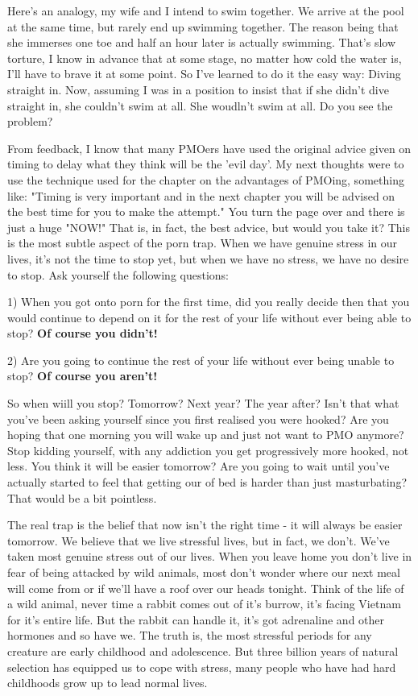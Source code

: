 Here's an analogy, my wife and I intend to swim together. We arrive at the pool at the same time, but rarely end up swimming together. The reason being that she immerses one toe and half an hour later is actually swimming. That's slow torture, I know in advance that at some stage, no matter how cold the water is, I'll have to brave it at some point. So I've learned to do it the easy way: Diving straight in. Now, assuming I was in a position to insist that if she didn't dive straight in, she couldn't swim at all. She woudln't swim at all. Do you see the problem?

From feedback, I know that many PMOers have used the original advice given on timing to delay what they think will be the 'evil day'. My next thoughts were to use the technique used for the chapter on the advantages of PMOing, something like: "Timing is very important and in the next chapter you will be advised on the best time for you to make the attempt." You turn the page over and there is just a huge "NOW!" That is, in fact, the best advice, but would you take it? This is the most subtle aspect of the porn trap. When we have genuine stress in our lives, it's not the time to stop yet, but when we have no stress, we have no desire to stop. Ask yourself the following questions:

  1) When you got onto porn for the first time, did you really decide then that you would continue to depend on it for the rest of your life without ever being able to stop? \textbf{Of course you didn't!}

  2) Are you going to continue the rest of your life without ever being unable to stop? \textbf{Of course you aren't!}

So when wiill you stop? Tomorrow? Next year? The year after? Isn't that what you've been asking yourself since you first realised you were hooked? Are you hoping that one morning you will wake up and just not want to PMO anymore? Stop kidding yourself, with any addiction you get progressively more hooked, not less. You think it will be easier tomorrow? Are you going to wait until you've actually started to feel that getting our of bed is harder than just masturbating? That would be a bit pointless.

The real trap is the belief that now isn't the right time - it will always be easier tomorrow. We believe that we live stressful lives, but in fact, we don't. We've taken most genuine stress out of our lives. When you leave home you don't live in fear of being attacked by wild animals, most don't wonder where our next meal will come from or if we'll have a roof over our heads tonight. Think of the life of a wild animal, never time a rabbit comes out of it's burrow, it's facing Vietnam for it's entire life. But the rabbit can handle it, it's got adrenaline and other hormones and so have we. The truth is, the most stressful periods for any creature are early childhood and adolescence. But three billion years of natural selection has equipped us to cope with stress, many people who have had hard childhoods grow up to lead normal lives.

